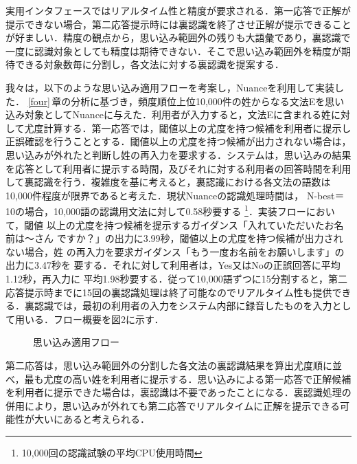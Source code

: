 実用インタフェースではリアルタイム性と精度が要求される．第一応答で正解が
提示できない場合，第二応答提示時には裏認識を終了させ正解が提示できること
が好ましい．精度の観点から，思い込み範囲外の残りも大語彙であり，裏認識で
一度に認識対象としても精度は期待できない．そこで思い込み範囲外を精度が期
待できる対象数毎に分割し，各文法に対する裏認識を提案する．

我々は，以下のような思い込み適用フローを考案し，Nuanceを利用して実装した．
\ref{four}\,章の分析に基づき，頻度順位上位10,000件の姓からなる文法Eを思い
込み対象としてNuanceに与えた．利用者が入力すると，文法Eに含まれる姓に対
して尤度計算する．第一応答では，閾値以上の尤度を持つ候補を利用者に提示し
正誤確認を行うこととする．閾値以上の尤度を持つ候補が出力されない場合は，
思い込みが外れたと判断し姓の再入力を要求する．システムは，思い込みの結果
を応答として利用者に提示する時間，及びそれに対する利用者の回答時間を利用
して裏認識を行う．複雑度を基に考えると，裏認識における各文法の語数は10,000件程度が限界であると考えた．現状Nuanceの認識処理時間は，
N-best＝10の場合，10,000語の認識用文法に対して0.58秒要する
\footnote{10,000回の認識試験の平均CPU使用時間}．実装フローにおいて，閾値
以上の尤度を持つ候補を提示するガイダンス「入れていただいたお名前は〜さん
ですか？」の出力に3.99秒，閾値以上の尤度を持つ候補が出力されない場合，姓
の再入力を要求ガイダンス「もう一度お名前をお願いします」の出力に3.47秒を
要する．それに対して利用者は，Yes又はNoの正誤回答に平均1.12秒，再入力に
平均1.98秒要する．従って10,000語ずつに15分割すると，第二応答提示時までに15回の裏認識処理は終了可能なのでリアルタイム性も提供できる．裏認識では，最初の利用者の入力をシステム内部に録音したものを入力として用いる．フロー概要を図2に示す．
\begin{figure}[htbp]
 \vspace*{-1cm}
  \begin{center}
    \leavevmode
   \epsfxsize=14cm
   \epsfysize=18cm
    \caption{思い込み適用フロー}
   \label{fig2}
  \end{center}
\end{figure}
第二応答は，思い込み範囲外の分割した各文法の裏認識結果を算出尤度順に並べ，最も尤度の高い姓を利用者に提示する．思い込みによる第一応答で正解候補を利用者に提示できた場合は，裏認識は不要であったことになる．裏認識処理の併用により，思い込みが外れても第二応答でリアルタイムに正解を提示できる可能性が大いにあると考えられる．
